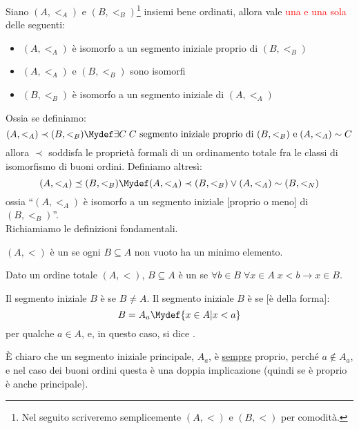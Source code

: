 \documentclass[11pt]{scrartcl}
\begin{document}
\begin{theorem}
	Siano $(A,<_A)$ e $(B,<_B)$\footnote{Nel seguito scriveremo semplicemente $(A,<)$ e $(B,<)$ per comodità.} insiemi bene ordinati, allora vale \textcolor{red}{una e una sola} delle seguenti:
	\begin{itemize}
		\item $(A,<_A)$ è isomorfo a un segmento iniziale proprio di $(B,<_B)$
		\item $(A,<_A)$ e $(B,<_B)$ sono isomorfi
		\item $(B,<_B)$ è isomorfo a un segmento iniziale di $(A,<_A)$
	\end{itemize}
\end{theorem}

Ossia se definiamo:
\[ (A,<_A) \prec (B,<_B) \Mydef \exists C \; \text{$C$ segmento iniziale proprio di $(B,<_B)$ e} \; (A,<_A) \sim C
	\]
allora $\prec$ soddisfa le proprietà formali di un ordinamento totale fra le classi di isomorfismo di buoni ordini.
Definiamo altresì:
\[ (A,<_A) \preceq (B,<_B) \Mydef (A,<_A) \prec (B,<_B) \lor (A,<_A) \sim (B,<_N)
	\]
ossia ``$(A,<_A)$ è isomorfo a un segmento iniziale [proprio o meno] di $(B,<_B)$''.\\
Richiamiamo le definizioni fondamentali.

\begin{definition}
	$(A,<)$ è un  se ogni $B \subseteq A$ non vuoto ha un minimo elemento.
\end{definition}

\begin{definition}
	Dato un ordine totale $(A,<)$, $B \subseteq A$ è un  se $\forall b \in B \; \forall x \in A \; x < b \rightarrow x \in B$.
\end{definition}

\begin{definition}
	Il segmento iniziale $B$ è  se $B \ne A$. Il segmento iniziale $B$ è  se [è della forma]:
	\[ B = A_a \Mydef \{x \in A | x < a\}
		\]
	per qualche $a \in A$, e, in questo caso, si dice .
\end{definition}

È chiaro che un segmento iniziale principale, $A_a$, è \underline{sempre} proprio, perché $a \not \in A_a$, e nel caso dei buoni ordini questa è una doppia implicazione (quindi se è proprio è 
anche principale).
\end{document}
